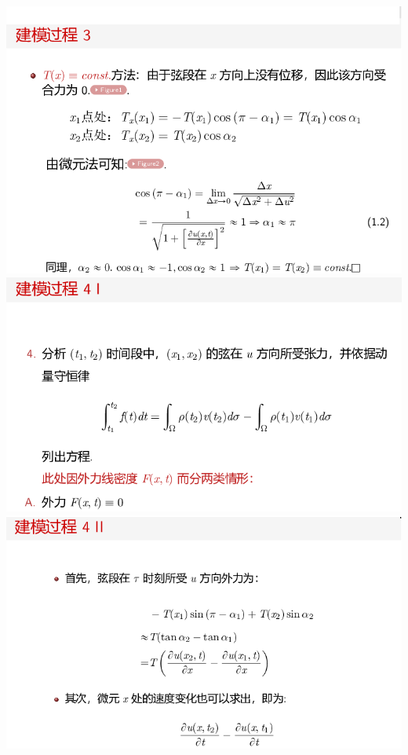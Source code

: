 \documentclass[11pt,a4paper]{ctexart}
\begin{document}
\begin{paracol}{2}
\includegraphics[width=\linewidth]{chap01_12.png}
\includegraphics[width=\linewidth]{chap01_13.png}
\includegraphics[width=\linewidth]{chap01_14.png}

\newpage


\end{paracol}
\end{document}
